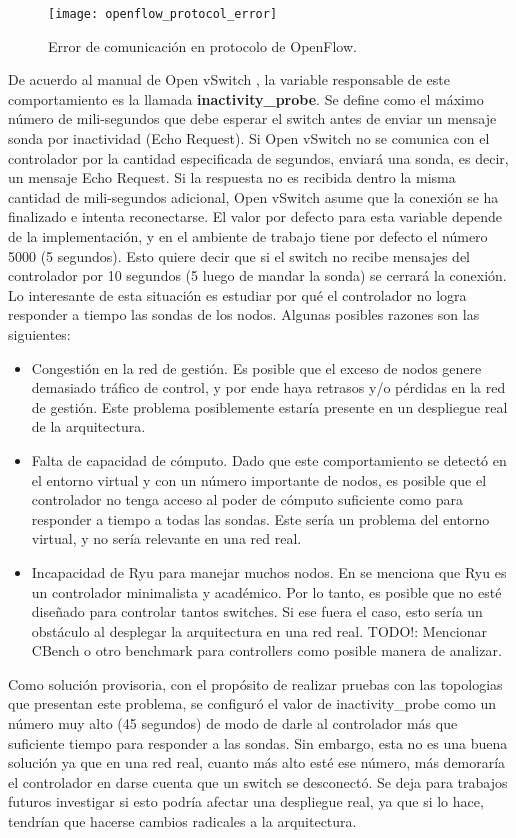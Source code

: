 \begin{figure}[t]
	\caption{Error de comunicación en protocolo de OpenFlow.}
	\texttt{[image: openflow\_protocol\_error]}
	\centering
	\label{fig:openflow_protocol_error}
\end{figure}
De acuerdo al manual de Open vSwitch \cite{ovs-vswitchd-conf}, la variable responsable de este comportamiento es la llamada \textbf{inactivity\_probe}. Se define como el máximo número de mili-segundos que debe esperar el switch antes de enviar un mensaje sonda por inactividad (Echo Request). Si Open vSwitch no se comunica con el controlador por la cantidad especificada de segundos, enviará una sonda, es decir, un mensaje Echo Request. Si la respuesta no es recibida dentro la misma cantidad de mili-segundos adicional, Open vSwitch asume que la conexión se ha finalizado e intenta reconectarse. El valor por defecto para esta variable depende de la implementación, y en el ambiente de trabajo tiene por defecto el número 5000 (5 segundos). Esto quiere decir que si el switch no recibe mensajes del controlador por 10 segundos (5 luego de mandar la sonda) se cerrará la conexión. \\
Lo interesante de esta situación es estudiar por qué el controlador no logra responder a tiempo las sondas de los nodos. Algunas posibles razones son las siguientes:
\begin{itemize}
	\item Congestión en la red de gestión. Es posible que el exceso de nodos genere demasiado tráfico de control, y por ende haya retrasos y/o pérdidas en la red de gestión. Este problema posiblemente estaría presente en un despliegue real de la arquitectura.
	\item Falta de capacidad de cómputo. Dado que este comportamiento se detectó en el entorno virtual y con un número importante de nodos, es posible que el controlador no tenga acceso al poder de cómputo suficiente como para responder a tiempo a todas las sondas. Este sería un problema del entorno virtual, y no sería relevante en una red real.
	\item Incapacidad de Ryu para manejar muchos nodos. En \cite{proyecto-rrap} se menciona que Ryu es un controlador minimalista y académico. Por lo tanto, es posible que no esté diseñado para controlar tantos switches. Si ese fuera el caso, esto sería un obstáculo al desplegar la arquitectura en una red real. TODO!: Mencionar CBench o otro benchmark para controllers como posible manera de analizar.
\end{itemize}
Como solución provisoria, con el propósito de realizar pruebas con las topologias que presentan este problema, se configuró el valor de inactivity\_probe como un número muy alto (45 segundos) de modo de darle al controlador más que suficiente tiempo para responder a las sondas. Sin embargo, esta no es una buena solución ya que en una red real, cuanto más alto esté ese número, más demoraría el controlador en darse cuenta que un switch se desconectó. Se deja para trabajos futuros investigar si esto podría afectar una despliegue real, ya que si lo hace, tendrían que hacerse cambios radicales a la arquitectura.

